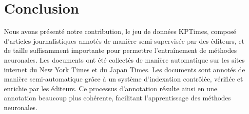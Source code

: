 




\section{Conclusion}

Nous avons présenté notre contribution, le jeu de données KPTimes, composé d'articles journalistiques annotés de manière semi-supervisée par des éditeurs, et de taille suffisamment importante pour permettre l'entraînement de méthodes neuronales.
Les documents ont été collectés de manière automatique sur les sites internet du New York Times et du Japan Times.
Les documents sont annotés de manière semi-automatique grâce à un système d'indexation contrôlée, vérifiée et enrichie par les éditeurs.
Ce processus d'annotation résulte ainsi en une annotation beaucoup plus cohérente, facilitant l'apprentissage des méthodes neuronales.

